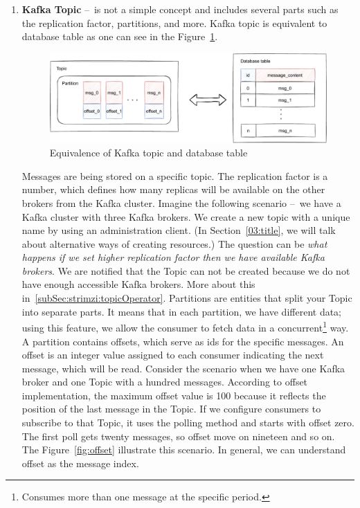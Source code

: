 \begin{enumerate}
    \item \textbf{Kafka Topic} \---\ is not a simple concept and includes several parts such as the replication factor, partitions, and more.
    Kafka topic is equivalent to database table as one can see in the Figure~\ref{fig:topicAndDatabaseTable}.
     \begin{figure}[!ht]
    \centering
    \includegraphics[scale=0.80]{obrazky-figures/02-preliminaries/02-kafka/03-database-relation}
    \caption{Equivalence of Kafka topic and database table}
    \label{fig:topicAndDatabaseTable}
    \end{figure}

    Messages are being stored on a specific topic.
    The replication factor is a number, which defines how many replicas will be available on the other brokers from the Kafka cluster.
    Imagine the following scenario \---\ we have a Kafka cluster with three Kafka brokers.
    We create a new topic with a unique name by using an administration client. (In Section~\ref{03:title}, we will talk about alternative ways of creating resources.) The question can be \emph{what happens if we set higher replication factor then we have available Kafka brokers}.
    We are notified that the Topic can not be created because we do not have enough accessible Kafka brokers.
    More about this in~\ref{subSec:strimzi:topicOperator}.
    Partitions are entities that split your Topic into separate parts.
    It means that in each partition, we have different data; using this feature, we allow the consumer to fetch data in a concurrent\footnote{Consumes more than one message at the specific period.} way.
    A partition contains offsets, which serve as ids for the specific messages.
    An offset is an integer value assigned to each consumer indicating the next message, which will be read.
    Consider the scenario when we have one Kafka broker and one Topic with a hundred messages.
    According to offset implementation, the maximum offset value is 100 because it reflects the position of the last message in the Topic.
    If we configure consumers to subscribe to that Topic, it uses the polling method and starts with offset zero.
    The first poll gets twenty messages, so offset move on nineteen and so on. The Figure~\ref{fig:offset} illustrate this scenario.
    In general, we can understand offset as the message index.
    

\end{enumerate}

